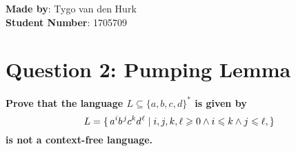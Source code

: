 \documentclass[a4paper]{article}
\begin{document}
    \setlength{\parskip}{0.5em}
    \setlength{\parindent}{0cm}
    \textbf{Made by}: Tygo van den Hurk \\
    \textbf{Student Number}: 1705709 \\
    \section*{Question 2: Pumping Lemma}
        \textbf{Prove that the language $L \subseteq \{a,b,c,d\}^\ast$ is given by}
        \begin{displaymath}
            L =
            \lbrace \, a^i b^{\mkern2mu j} c^k d^{\mkern1mu \ell} \mid
            i, j, k, \ell \geqslant 0 \land
            i \leqslant k \land
            j \leqslant \ell, \rbrace
        \end{displaymath}
        \textbf{is not a context-free language.}
        \medskip
\end{document}
